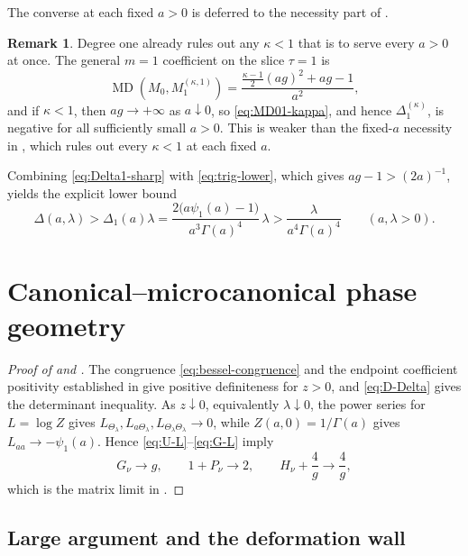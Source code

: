 \documentclass[11pt,a4paper]{amsart}
\numberwithin{equation}{section}
\theoremstyle{plain}
\theoremstyle{definition}
\newtheorem{remark}[theorem]{Remark}
\newcommand{\MD}{\operatorname{MD}}
\newcommand{\Thetal}{\Theta_{\lambda}}
\begin{document}
The converse at each fixed \(a>0\) is deferred to the necessity part of
.

\begin{remark}\label{rem:uniform-degree-one}
Degree one already rules out any \(\kappa<1\) that is to serve every \(a>0\) at
once.  The general \(m=1\) coefficient on the slice \(\tau=1\) is
\begin{equation}\label{eq:MD01-kappa}
 \MD(M_0,M_1^{(\kappa,1)})
 =\frac{\frac{\kappa-1}{2}(ag)^2+ag-1}{a^2},
\end{equation}
and if \(\kappa<1\), then \(ag\to+\infty\) as \(a\downarrow0\), so
\eqref{eq:MD01-kappa}, and hence \(\Delta_1^{(\kappa)}\), is negative for all
sufficiently small \(a>0\).  This is weaker than the fixed-\(a\) necessity in
, which rules out every \(\kappa<1\) at each fixed \(a\).
\end{remark}

Combining \eqref{eq:Delta1-sharp} with \eqref{eq:trig-lower}, which gives
\(ag-1>(2a)^{-1}\), yields the explicit lower bound
\[
 \Delta(a,\lambda)>\Delta_1(a)\lambda
 =\frac{2\bigl(a\psi_1(a)-1\bigr)}{a^3\Gamma(a)^4}\,\lambda
 >\frac{\lambda}{a^4\Gamma(a)^4}
 \qquad(a,\lambda>0).
\]


\section{Canonical--microcanonical phase geometry}\label{sec:phase}

\begin{proof}[Proof of  and ]
The congruence \eqref{eq:bessel-congruence} and the endpoint coefficient
positivity established in  give positive
definiteness for \(z>0\), and
\eqref{eq:D-Delta} gives the determinant inequality.  As \(z\downarrow0\),
equivalently \(\lambda\downarrow0\), the power series for \(L=\log Z\) gives
\(L_{\Thetal},L_{a\Thetal},L_{\Thetal\Thetal}\to0\), while
\(Z(a,0)=1/\Gamma(a)\) gives \(L_{aa}\to-\psi_1(a)\).  Hence
\eqref{eq:U-L}--\eqref{eq:G-L} imply
\[
 G_\nu\longrightarrow g,\qquad
 1+P_\nu\longrightarrow2,\qquad
 H_\nu+\frac4g\longrightarrow\frac4g,
\]
which is the matrix limit in .
\end{proof}

\subsection{Large argument and the deformation wall}\label{subsec:large-argument-deformation-wall}
\end{document}
